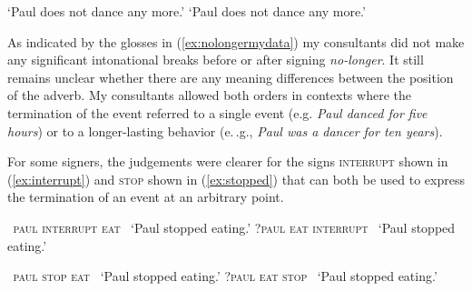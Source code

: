 %
\begin{exe}
\ex\label{ex:nolongermydata}\begin{xlist} 
\ex {}  
\glt `Paul does not dance any more.' \label{ex:nolongermydataa}
\ex {} 
\glt `Paul does not dance any more.' \label{ex:nolongermydataa}
\end{xlist}
\end{exe}

\noindent As indicated by the glosses in (\ref{ex:nolongermydata}) my consultants did not make any significant intonational breaks before or after signing \textit{no-longer}. It still remains unclear whether there are any meaning differences between the position of the adverb. My consultants allowed both orders in contexts where the termination of the event referred to a single event (e.g. \textit{Paul danced for five hours}) or to a longer-lasting behavior (e.\,.g., \textit{Paul was a dancer for ten years}). 

For some signers, the judgements were clearer for the signs \textsc{interrupt} shown in (\ref{ex:interrupt}) and \textsc{stop} shown in (\ref{ex:stopped}) that can both be used to express the termination of an event at an arbitrary point. 

\begin{exe}
\ex\label{ex:interrupt}\begin{xlist} 
\ex
{\textcolor{white}{?}\textsc{paul interrupt eat}}      
\glt \textcolor{white}{?}`Paul stopped eating.' \label{ex:interrupta}
\ex
{?\textsc{paul eat interrupt}}       
\glt \textcolor{white}{?}`Paul stopped eating.' \label{ex:interruptb}
\end{xlist}
\end{exe}

\begin{exe}
\ex\label{ex:stopped}\begin{xlist} 
\ex
{\textcolor{white}{?}\textsc{paul stop eat}}      
\glt \textcolor{white}{*}`Paul stopped eating.' \label{ex:stoppeda}
\ex
{?\textsc{paul eat stop}}       
\glt \textcolor{white}{?}`Paul stopped eating.' \label{ex:stoppedb}
\end{xlist}
\end{exe}


